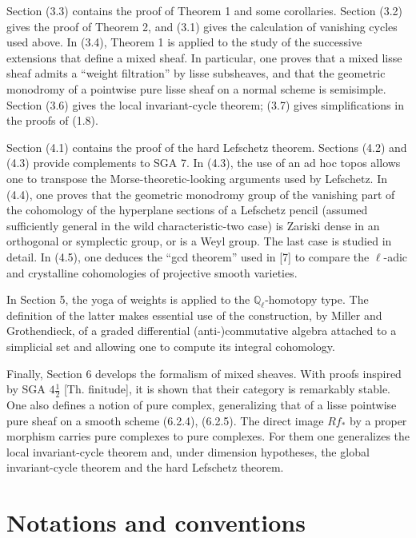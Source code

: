 \documentclass[11pt]{article}
\theoremstyle{remark}
\newcommand{\Ql}{\mathbb{Q}_\ell}
\begin{document}
Section (3.3) contains the proof of Theorem 1 and some corollaries. Section (3.2) gives the proof of Theorem 2, and (3.1) gives the calculation of vanishing cycles used above. In (3.4), Theorem 1 is applied to the study of the successive extensions that define a mixed sheaf. In particular, one proves that a mixed lisse sheaf admits a ``weight filtration'' by lisse subsheaves, and that the geometric monodromy of a pointwise pure lisse sheaf on a normal scheme is semisimple. Section (3.6) gives the local invariant-cycle theorem; (3.7) gives simplifications in the proofs of (1.8).

Section (4.1) contains the proof of the hard Lefschetz theorem. Sections (4.2) and (4.3) provide complements to SGA 7. In (4.3), the use of an ad hoc topos allows one to transpose the Morse-theoretic-looking arguments used by Lefschetz. In (4.4), one proves that the geometric monodromy group of the vanishing part of the cohomology of the hyperplane sections of a Lefschetz pencil (assumed sufficiently general in the wild characteristic-two case) is Zariski dense in an orthogonal or symplectic group, or is a Weyl group. The last case is studied in detail. In (4.5), one deduces the ``gcd theorem'' used in [7] to compare the $\ell$-adic and crystalline cohomologies of projective smooth varieties.

In Section 5, the yoga of weights is applied to the $\Ql$-homotopy type. The definition of the latter makes essential use of the construction, by Miller and Grothendieck, of a graded differential (anti-)commutative algebra attached to a simplicial set and allowing one to compute its integral cohomology.

Finally, Section 6 develops the formalism of mixed sheaves. With proofs inspired by SGA $4\frac12$ [Th. finitude], it is shown that their category is remarkably stable. One also defines a notion of pure complex, generalizing that of a lisse pointwise pure sheaf on a smooth scheme (6.2.4), (6.2.5). The direct image $Rf_{*}$ by a proper morphism carries pure complexes to pure complexes. For them one generalizes the local invariant-cycle theorem and, under dimension hypotheses, the global invariant-cycle theorem and the hard Lefschetz theorem.

\section*{Notations and conventions}
\end{document}
